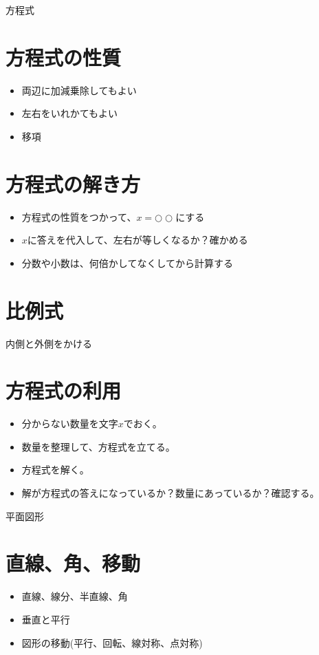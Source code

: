 \documentclass[11pt]{article}
\begin{document}
\newpage

{\LARGE \noindent 方程式}

\section{方程式の性質}
\begin{itemize}
\item 両辺に加減乗除してもよい
\item 左右をいれかてもよい
\item 移項
\end{itemize}

\section{方程式の解き方}
\begin{itemize}
\item 方程式の性質をつかって、$x=○○$にする
\item $x$に答えを代入して、左右が等しくなるか？確かめる
\item 分数や小数は、何倍かしてなくしてから計算する
\end{itemize}

\section{比例式}
内側と外側をかける

\section{方程式の利用}
\begin{itemize}
\item 分からない数量を文字$x$でおく。
\item 数量を整理して、方程式を立てる。
\item 方程式を解く。
\item 解が方程式の答えになっているか？数量にあっているか？確認する。
\end{itemize}

\newpage

{\LARGE \noindent 平面図形}

\section{直線、角、移動}
\begin{itemize}
\item 直線、線分、半直線、角
\item 垂直と平行
\item 図形の移動(平行、回転、線対称、点対称)
\end{itemize}
\end{document}
